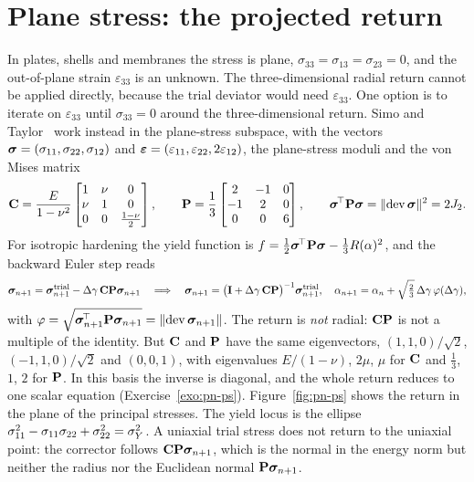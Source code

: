 \section{Plane stress: the projected return}\label{sec:pn-ps}
%
In plates, shells and membranes the stress is plane, $\sigma_{33}=\sigma_{13}=\sigma_{23}=0$,
and the out-of-plane strain $\varepsilon_{33}$ is an unknown. The
three-dimensional radial return cannot be applied directly, because the trial
deviator would need $\varepsilon_{33}$. One option is to iterate on
$\varepsilon_{33}$ until $\sigma_{33}=0$ around the three-dimensional return.
Simo and Taylor~\cite{SimoTaylor1986} work instead in the plane-stress subspace,
with the vectors $\bm{\sigma}=(\sigma_{11},\sigma_{22},\sigma_{12})$ and
$\bm{\varepsilon}=(\varepsilon_{11},\varepsilon_{22},2\varepsilon_{12})$, the
plane-stress moduli and the von Mises matrix
\[
  \mathbf{C}=\frac{E}{1-\nu^2}\begin{bmatrix}1&\nu&0\\ \nu&1&0\\ 0&0&\tfrac{1-\nu}{2}\end{bmatrix},
  \qquad
  \mathbf{P}=\frac13\begin{bmatrix}2&-1&0\\ -1&2&0\\ 0&0&6\end{bmatrix},
  \qquad
  \bm{\sigma}^{\!\top}\mathbf{P}\bm{\sigma}=\lVert \operatorname{dev}\bm{\sigma}\rVert^2=2J_2 .
\]
For isotropic hardening the yield function is
$f=\tfrac12\bm{\sigma}^{\!\top}\mathbf{P}\bm{\sigma}-\tfrac13R(\alpha)^2$, and the
backward Euler step reads
\begin{equation}\label{eq:pn-ps}
  \bm{\sigma}_{n+1}=\bm{\sigma}^{\mathrm{trial}}_{n+1}-\Delta\gamma\,\mathbf{C}\mathbf{P}\bm{\sigma}_{n+1}
  \quad\Longrightarrow\quad
  \bm{\sigma}_{n+1}=\bigl(\mathbf{I}+\Delta\gamma\,\mathbf{C}\mathbf{P}\bigr)^{-1}\bm{\sigma}^{\mathrm{trial}}_{n+1},
  \quad
  \alpha_{n+1}=\alpha_n+\sqrt{\tfrac23}\,\Delta\gamma\,\varphi(\Delta\gamma),
\end{equation}
with $\varphi=\sqrt{\bm{\sigma}_{n+1}^{\!\top}\mathbf{P}\bm{\sigma}_{n+1}}=\lVert \operatorname{dev}\bm{\sigma}_{n+1}\rVert$.
The return is \emph{not} radial: $\mathbf{C}\mathbf{P}$ is not a multiple of the
identity. But $\mathbf{C}$ and $\mathbf{P}$ have the same eigenvectors,
$(1,1,0)/\sqrt2$, $(-1,1,0)/\sqrt2$ and $(0,0,1)$, with eigenvalues
$E/(1-\nu)$, $2\mu$, $\mu$ for $\mathbf{C}$ and $\tfrac13$, $1$, $2$ for
$\mathbf{P}$. In this basis the inverse is diagonal, and the whole return
reduces to one scalar equation (Exercise~\ref{exo:pn-ps}).
Figure~\ref{fig:pn-ps} shows the return in the plane of the principal
stresses. The yield locus is the ellipse
$\sigma_{11}^2-\sigma_{11}\sigma_{22}+\sigma_{22}^2=\sigma_{Y}^2$. A uniaxial trial
stress does not return to the uniaxial point: the corrector follows
$\mathbf{C}\mathbf{P}\bm{\sigma}_{n+1}$, which is the normal in the energy norm but
neither the radius nor the Euclidean normal $\mathbf{P}\bm{\sigma}_{n+1}$.

